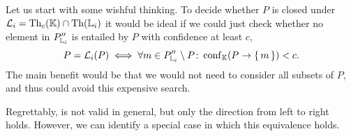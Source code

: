 Let us start with some wishful thinking.  To decide whether $P$ is closed under
$\mathcal{L}_{i} = \operatorname{Th}_{c}({\mathbb{K}}) \cap \operatorname{Th}({\mathbb{L}}_{i})$ it would be ideal if we could
just check whether no element in $P_{{\mathbb{L}}_{i}}''$ is entailed by $P$ with confidence at
least $c$, \ie
\begin{equation}
  \label{eq:43}
  P = \mathcal{L}_{i}(P) \iff \forall m \in P_{{\mathbb{L}}_{i}}'' \setminus P \colon
  \operatorname{conf}_{{\mathbb{K}}}(P \to {\ensuremath{\{\,m\,\}}}) < c.
\end{equation}
The main benefit would be that we would not need to consider all subsets of $P$, and thus
could avoid this expensive search.

Regrettably,  is not valid in general, but only the direction from left to
right holds.  However, we can identify a special case in which this equivalence holds.

